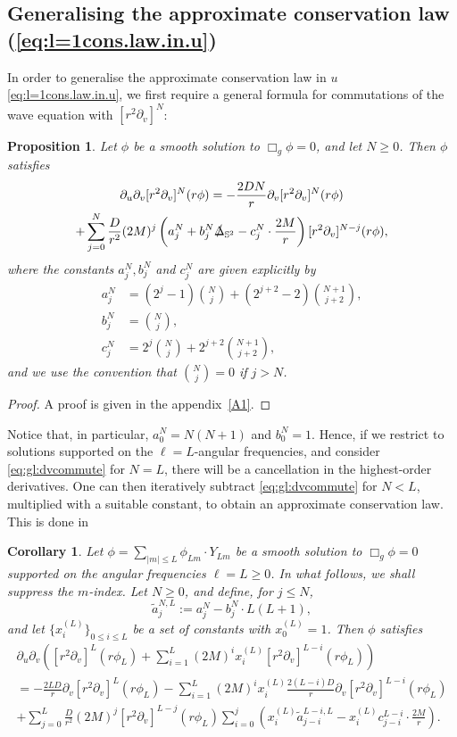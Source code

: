 \documentclass[11pt,english]{article}
\numberwithin{equation}{section}
\newtheorem{cor}{Corollary}[section]
\theoremstyle{remark}
\theoremstyle{plain}
\newtheorem{prop}{Proposition}[section]
\theoremstyle{remark}
\newcommand{\pu}{\partial_u}
\newcommand{\pv}{\partial_v}
\renewcommand{\(}{\left(}
\renewcommand{\)}{\right)}
\begin{document}
\subsection{Generalising the approximate conservation law (\ref{eq:l=1cons.law.in.u})}
In order to generalise the approximate conservation law in $u$ \eqref{eq:l=1cons.law.in.u},  we first  require a general formula for commutations of the wave equation with $[r^2\pv]^N$:
\begin{prop}\label{prop:gl:dvcommute}
Let $\phi$ be a smooth solution to $\Box_g\phi=0$, and let $N\geq 0$. Then $\phi$ satisfies
\begin{multline}\label{eq:gl:dvcommute}
\pu\pv[r^2\pv]^N(r\phi)=-\frac{2DN}{r}\pv[r^2\pv]^N(r\phi)\\+
\sum_{j=0}^N\frac{D}{r^2}(2M)^j\left(a_j^N+b_j^N\slashed{\Delta}_{\mathbb{S}^2}-c_j^N\cdot\frac{2M}{r}\right)[r^2\pv]^{N-j}(r\phi),
\end{multline}
where the constants $a_j^N, b_j^N$ and $c_j^N$ are given explicitly by
\begin{align}
a_j^N&=(2^j-1)\binom{N}{j}+(2^{j+2}-2)\binom{N+1}{j+2},\\
b_j^N&=\binom{N}{j},\\
c_j^N&=2^j\binom{N}{j}+2^{j+2}\binom{N+1}{j+2},
\end{align}
and we use the convention that $\binom{N}{j}=0$ if $j>N$.
\end{prop}
\begin{proof}
A proof is given in the appendix~\ref{A1}.
\end{proof}
Notice that, in particular, $a_0^N=N(N+1)$ and $b_0^N=1$. Hence, if we restrict to solutions supported on the $\ell=L$-angular frequencies, and consider \eqref{eq:gl:dvcommute} for $N=L$, there will be a cancellation in the highest-order derivatives. One can then iteratively subtract \eqref{eq:gl:dvcommute} for $N<L$, multiplied with a suitable constant, to obtain an approximate conservation law. This is done in
\begin{cor}\label{cor:gl}
Let $\phi=\sum_{|m|\leq L}\phi_{Lm}\cdot Y_{Lm}$ be a smooth solution to $\Box_g\phi=0$ supported on the angular frequencies $\ell=L\geq 0$. In what follows, we shall suppress the $m$-index. Let $N\geq 0$, and define, for $j\leq N$,
\begin{equation}
\tilde{a}_j^{N,L}:=a_j^N-b_j^N\cdot L(L+1),
\end{equation}
and let $\{x_i^{(L)}\}_{0\leq i\leq L}$ be a set of constants with $x_0^{(L)}=1$. 
Then $\phi$ satisfies
\begin{multline}
\pu\pv\left([r^2\pv]^L(r\phi_L)+\sum_{i=1}^L(2M)^ix_i^{(L)}[r^2\pv]^{L-i}(r\phi_L)\right)\\
=-\frac{2LD}{r}\pv[r^2\pv]^L(r\phi_L)-\sum_{i=1}^L(2M)^ix_i^{(L)}\frac{2(L-i)D}{r}\pv[r^2\pv]^{L-i}(r\phi_L)\\
+\sum_{j=0}^L\frac{D}{r^2}(2M)^j[r^2\pv]^{L-j}(r\phi_L)\sum_{i=0}^j\left( x_i^{(L)}\tilde{a}_{j-i}^{L-i,L}-x_i^{(L)} c_{j-i}^{L-i}\cdot \frac{2M}{r} \right).
\end{multline}
\end{cor}
\end{document}
